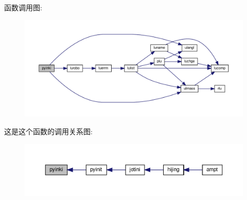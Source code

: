 函数调用图\+:
\nopagebreak
\begin{figure}[H]
\begin{center}
\leavevmode
\includegraphics[width=350pt]{pyinki_8f90_ae77e63debb43cbe29863797dcb9f4f09_cgraph}
\end{center}
\end{figure}
这是这个函数的调用关系图\+:
\nopagebreak
\begin{figure}[H]
\begin{center}
\leavevmode
\includegraphics[width=350pt]{pyinki_8f90_ae77e63debb43cbe29863797dcb9f4f09_icgraph}
\end{center}
\end{figure}
